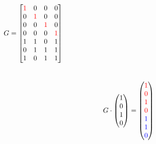 \begin{frame}
  \begin{center}
  \end{center}

  \begin{columns}
	  \[
		G = \begin{bmatrix}
		  \textcolor{red}{1} & 0 & 0 & 0 \\
		  0 & \textcolor{red}{1} & 0 & 0 \\
		  0 & 0 & \textcolor{red}{1} & 0 \\
		  0 & 0 & 0 & \textcolor{red}{1} \\
		  1 & 1 & 0 & 1 \\
		  0 & 1 & 1 & 1 \\
		  1 & 0 & 1 & 1 \\
		\end{bmatrix}
	  \]

  \end{columns}

  \pause
  \[
	G \cdot \begin{pmatrix}
	  1 \\ 0 \\ 1 \\ 0
	\end{pmatrix}
	= \begin{pmatrix}
	  \textcolor{red}{1} \\ \textcolor{red}{0} \\ \textcolor{red}{1} \\ \textcolor{red}{0} \\ \textcolor{blue}{1} \\ \textcolor{blue}{1} \\ \textcolor{blue}{0}
	\end{pmatrix}
  \]
\end{frame}

